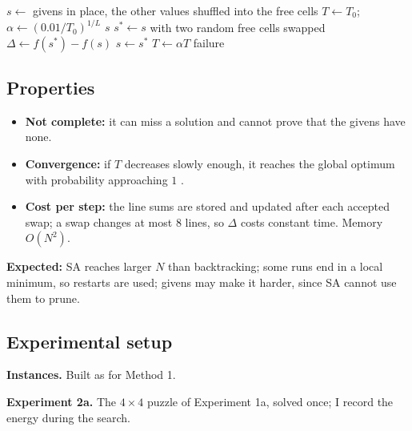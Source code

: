 \documentclass[11pt,a4paper]{article}
\begin{document}
\begin{algorithm}[H]
\small
\caption{Simulated annealing}
\label{alg:sa}
\begin{algorithmic}[1]
  \Repeat
    \State $s\gets$ givens in place, the other values shuffled into the free cells
    \State $T\gets T_0$; \ $\alpha\gets(0.01/T_0)^{1/L}$
       \State \Return $s$ \EndIf
      \State $s^*\gets s$ with two random free cells swapped
      \State $\Delta\gets f(s^*)-f(s)$
       \State $s\gets s^*$ \EndIf
      \State $T\gets\alpha T$
    \EndFor
  \State \Return failure
\EndFunction
\end{algorithmic}
\end{algorithm}

\subsection{Properties}

\begin{itemize}[nosep]
  \item \textbf{Not complete:} it can miss a solution and cannot prove that
        the givens have none.
  \item \textbf{Convergence:} if $T$ decreases slowly enough, it reaches the
        global optimum with probability approaching $1$
        \cite{slides,kirkpatrick}.
  \item \textbf{Cost per step:} the line sums are stored and updated after
        each accepted swap; a swap changes at most 8 lines, so $\Delta$
        costs constant time. Memory $O(N^2)$.
\end{itemize}
\noindent\textbf{Expected:} SA reaches larger $N$ than backtracking; some
runs end in a local minimum, so restarts are used; givens may make it
harder, since SA cannot use them to prune.

\subsection{Experimental setup}

\textbf{Instances.} Built as for Method 1.

\textbf{Experiment 2a.} The $4\times4$ puzzle of Experiment 1a, solved
once; I record the energy during the search.
\end{document}
